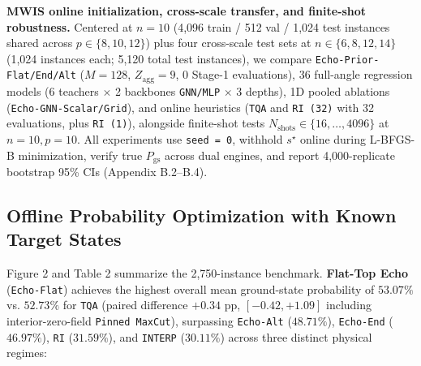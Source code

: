 \documentclass{article}
\theoremstyle{plain}
\theoremstyle{definition}
\begin{document}
\textbf{MWIS online initialization, cross-scale transfer, and finite-shot robustness.} Centered at $n=10$ (4,096 train / 512 val / 1,024 test instances shared across $p\in\{8,10,12\}$) plus four cross-scale test sets at $n\in\{6,8,12,14\}$ (1,024 instances each; 5,120 total test instances), we compare \texttt{Echo-Prior-Flat/\allowbreak{}End/\allowbreak{}Alt} ($M=128$, $Z_{\mathrm{agg}}=9$, $0$ Stage-1 evaluations), 36 full-angle regression models (6 teachers $\times$ 2 backbones \texttt{GNN/\allowbreak{}MLP} $\times$ 3 depths), 1D pooled ablations (\texttt{Echo-GNN-Scalar/\allowbreak{}Grid}), and online heuristics (\texttt{TQA} and \texttt{RI (32)} with 32 evaluations, plus \texttt{RI (1)}), alongside finite-shot tests $N_{\mathrm{shots}}\in\{16,\ldots,4096\}$ at $n=10, p=10$. All experiments use \texttt{seed = 0}, withhold $s^\star$ online during L-BFGS-B minimization, verify true $P_{\mathrm{gs}}$ across dual engines, and report 4,000-replicate bootstrap 95\% CIs (Appendix B.2--B.4).

\subsection{Offline Probability Optimization with Known Target States}\label{subsec:5_2}




Figure 2 and Table 2 summarize the 2,750-instance benchmark. \textbf{Flat-Top Echo} (\texttt{Echo-Flat}) achieves the highest overall mean ground-state probability of $\mathbf{53.07}\%$ vs. $52.73\%$ for \texttt{TQA} (paired difference $+0.34$ pp, $[-0.42, +1.09]$ including interior-zero-field \texttt{Pinned MaxCut}), surpassing \texttt{Echo-Alt} ($48.71\%$), \texttt{Echo-End} ($46.97\%$), \texttt{RI} ($31.59\%$), and \texttt{INTERP} ($30.11\%$) across three distinct physical regimes:
\end{document}
